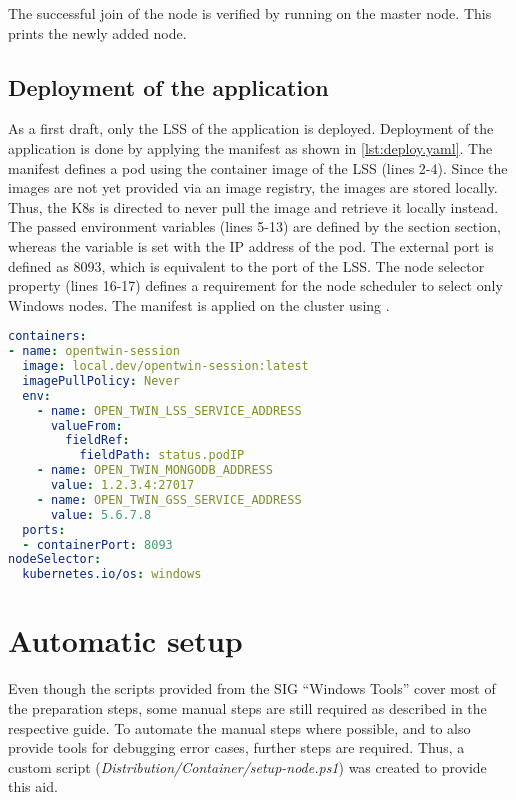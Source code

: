 The successful join of the node is verified by running  on the master node. This prints the newly added node.

\subsection{Deployment of the application}
As a first draft, only the \ac{LSS} of the application is deployed. 
Deployment of the application is done by applying the manifest as shown in \autoref{lst:deploy.yaml}.
The manifest defines a pod using the container image of the \ac{LSS} (lines 2-4). Since the images are not yet provided via an image registry, the images are stored locally. Thus, the \ac{K8s} is directed to never pull the image and retrieve it locally instead.
The passed environment variables (lines 5-13) are defined by the section  section, whereas the variable  is set with the \ac{IP} address of the pod. The external port is defined as 8093, which is equivalent to the port of the \ac{LSS}.
The node selector property (lines 16-17) defines a requirement for the node scheduler to select only \ac{Windows} nodes.
The manifest is applied on the cluster using .
\begin{lstlisting}[label=lst:deploy.yaml, caption={Partial section of configuration for cluster deployment of the \ac{LSS} (\textit{Distribution/Kubernetes/open\_twin.yaml})}, language=yaml]
containers:
- name: opentwin-session
  image: local.dev/opentwin-session:latest
  imagePullPolicy: Never
  env:
    - name: OPEN_TWIN_LSS_SERVICE_ADDRESS
      valueFrom:
        fieldRef:
          fieldPath: status.podIP
    - name: OPEN_TWIN_MONGODB_ADDRESS
      value: 1.2.3.4:27017
    - name: OPEN_TWIN_GSS_SERVICE_ADDRESS
      value: 5.6.7.8
  ports:
  - containerPort: 8093
nodeSelector:
  kubernetes.io/os: windows
\end{lstlisting}


\section{Automatic setup}
Even though the scripts provided from the \ac{SIG} \enquote{Windows Tools} cover most of the preparation steps, some manual steps are still required as described in the respective guide\cite{GitHubKubernetesSIGWindowsTools.20230213}. To automate the manual steps where possible, and to also provide tools for debugging error cases, further steps are required. Thus, a custom script (\textit{Distribution/Container/setup-node.ps1}) was created to provide this aid.

